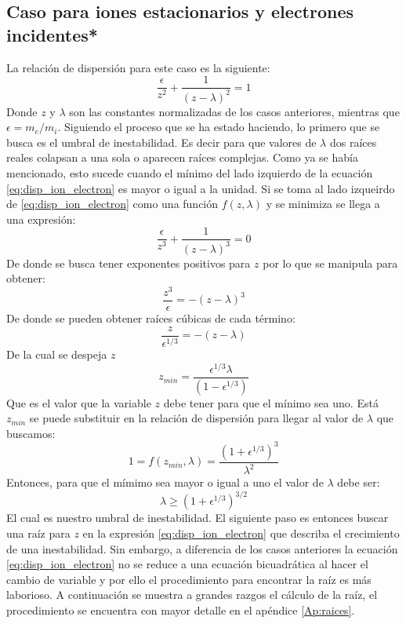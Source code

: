 \documentclass[12pt]{article}
\begin{document}
\subsection*{Caso para iones estacionarios y electrones incidentes*}
La relación de dispersión para este caso es la siguiente:
\begin{equation}
\label{eq:disp_ion_electron}
\frac{\epsilon}{z^2}+\frac{1}{(z-\lambda)^2}=1
\end{equation}
Donde $z$ y $\lambda$ son las constantes normalizadas de los casos anteriores, mientras que $\epsilon = m_e/m_i$.
Siguiendo el proceso que se ha estado haciendo, lo primero que se busca es el umbral de inestabilidad. Es decir para que valores de $\lambda$ dos raíces reales colapsan a una sola o aparecen raíces complejas. Como ya se había mencionado, esto sucede cuando el mínimo del lado izquierdo de la ecuación \ref{eq:disp_ion_electron} es mayor o igual a la unidad. Si se toma al lado izqueirdo de \ref{eq:disp_ion_electron} como una función $f(z,\lambda)$ y se minimiza se llega a una expresión:
\begin{equation}
\frac{\epsilon}{z^3}+\frac{1}{(z-\lambda)^3}=0
\end{equation}
De donde se busca tener exponentes positivos para $z$ por lo que se manipula para obtener:
\begin{equation}
\frac{z^3}{\epsilon}=-(z-\lambda)^3
\end{equation}
De donde se pueden obtener raíces cúbicas de cada término:
\begin{equation}
\frac{z}{\epsilon ^{1/3}}=-(z-\lambda)
\end{equation}
De la cual se despeja $z$
\begin{equation}
z_{min}=\frac{\epsilon ^{1/3}\lambda}{(1- \epsilon^{1/3})}
\end{equation}
Que es el valor que la variable $z$ debe tener para que el mínimo sea uno. Está $z_{min}$ se puede substituir en la relación de dispersión para llegar al valor de $\lambda$ que buscamos:
\begin{equation}
1=f(z_{min},\lambda)=\frac{(1+\epsilon^{1/3})^3}{\lambda^2}
\end{equation}
Entonces, para que el mímimo sea mayor o igual a uno el valor de $\lambda$ debe ser:
\begin{equation}
\label{eq:umbral_ion_electron}
\lambda \geq (1+\epsilon^{1/3})^{3/2}
\end{equation}
El cual es nuestro umbral de inestabilidad.
El siguiente paso es entonces buscar una raíz para $z$ en la expresión \ref{eq:disp_ion_electron} que describa el crecimiento de una inestabilidad. Sin embargo, a diferencia de los casos anteriores la ecuación \ref{eq:disp_ion_electron} no se reduce a una ecuación bicuadrática al hacer el cambio de variable y por ello el procedimiento para encontrar la raíz es más laborioso. A continuación se muestra a grandes razgos el cálculo de la raíz, el procedimiento se encuentra con mayor detalle en el apéndice \ref{Ap:raices}.\\
\end{document}
